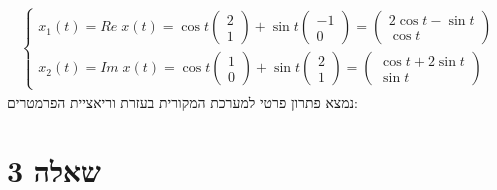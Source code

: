 \documentclass{article}
\begin{document}
\begin{align*}
    \begin{cases}
        x_1(t)=Re\;x(t)=\cos t \begin{pmatrix}
                                   2 \\
                                   1
                               \end{pmatrix} + \sin t \begin{pmatrix}
                                                          -1 \\
                                                          0
                                                      \end{pmatrix} =\begin{pmatrix}
                                                                         2\cos t - \sin t \\
                                                                         \cos t
                                                                     \end{pmatrix} \\
        x_2(t)=Im\;x(t)=\cos t \begin{pmatrix}
                                   1 \\
                                   0
                               \end{pmatrix}+\sin t \begin{pmatrix}
                                                        2 \\
                                                        1
                                                    \end{pmatrix} = \begin{pmatrix}
                                                                        \cos t + 2\sin t \\
                                                                        \sin t
                                                                    \end{pmatrix}
    \end{cases}
\end{align*}
נמצא פתרון פרטי למערכת המקורית בעזרת וריאציית הפרמטרים:

\pagebreak

\section*{שאלה 3}
\end{document}
